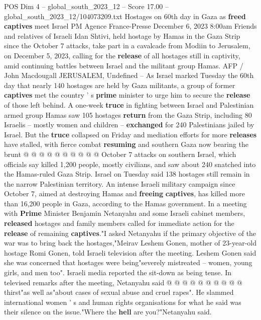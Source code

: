 \begin{textsample}{POS Dim 4 – global\_south\_2023\_12 – Score 17.00 – global\_south\_2023\_12/104073209.txt}  \label{ex:f4_pos_149}
Hostages on 60th day in Gaza as \textbf{freed} \textbf{captives} meet Israel PM Agence France-Presse December 6, 2023 8:00am Friends and relatives of Israeli Idan Shtivi, held hostage by Hamas in the Gaza Strip since the October 7 attacks, take part in a cavalcade from Modiin to Jerusalem, on December 5, 2023, calling for the \textbf{release} of all hostages still in captivity, amid continuing battles between Israel and the militant group Hamas.
AFP / John Macdougall JERUSALEM, Undefined -- As Israel marked Tuesday the 60th day that nearly 140 hostages are held by Gaza militants, a group of former \textbf{captives} met the country ' s \textbf{prime} minister to urge him to secure the \textbf{release} of those left behind.
A one-week \textbf{truce} in fighting between Israel and Palestinian armed group Hamas saw 105 hostages \textbf{return} from the Gaza Strip, including 80 Israelis -- mostly women and children -- \textbf{exchanged} for 240 Palestinians jailed by Israel.
But the \textbf{truce} collapsed on Friday and mediation efforts for more \textbf{releases} have stalled, with fierce combat \textbf{resuming} and southern Gaza now bearing the brunt @ @ @ @ @ @ @ @ @ @ October 7 attacks on southern Israel, which officials say killed 1,200 people, mostly civilians, and saw about 240 snatched into the Hamas-ruled Gaza Strip.
Israel on Tuesday said 138 hostages still remain in the narrow Palestinian territory.
An intense Israeli military campaign since October 7, aimed at destroying Hamas and \textbf{freeing} \textbf{captives}, has killed more than 16,200 people in Gaza, according to the Hamas government.
In a meeting with \textbf{Prime} Minister Benjamin Netanyahu and some Israeli cabinet members, \textbf{released} hostages and family members called for immediate action for the \textbf{release} of remaining \textbf{captives}."I asked Netanyahu if the primary objective of the war was to bring back the hostages,"Meirav Leshem Gonen, mother of 23-year-old hostage Romi Gonen, told Israeli television after the meeting.
Leshem Gonen said she was concerned that hostages were being"severely mistreated -- women, young girls, and men too".
Israeli media reported the sit-down as being tense.
In televised remarks after the meeting, Netanyahu said @ @ @ @ @ @ @ @ @ @ thirst"as well as"about cases of sexual abuse and cruel rapes".
He slammed international women ' s and human rights organisations for what he said was their silence on the issue."Where the \textbf{hell} are you?"Netanyahu said.

\end{textsample}
